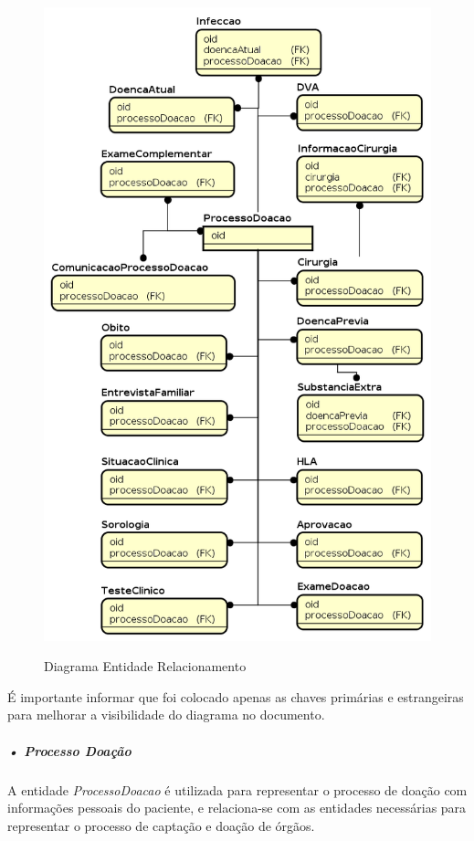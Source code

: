 \documentclass[portuguese,oneside]{tcc}
\begin{document}
\begin{figure}[htp]
\centering
\caption{Diagrama Entidade Relacionamento}
\includegraphics[scale=0.68]{er-diagram}
\label{fig:erDiagram}
\end{figure}

É importante informar que foi colocado apenas as chaves primárias e estrangeiras para melhorar a visibilidade do diagrama no documento.

\subparagraph{• Processo Doação}
A entidade \textit{ProcessoDoacao} é utilizada para representar o processo de doação com informações pessoais do paciente, e relaciona-se com as entidades necessárias para representar o processo de captação e doação de órgãos.
\end{document}
